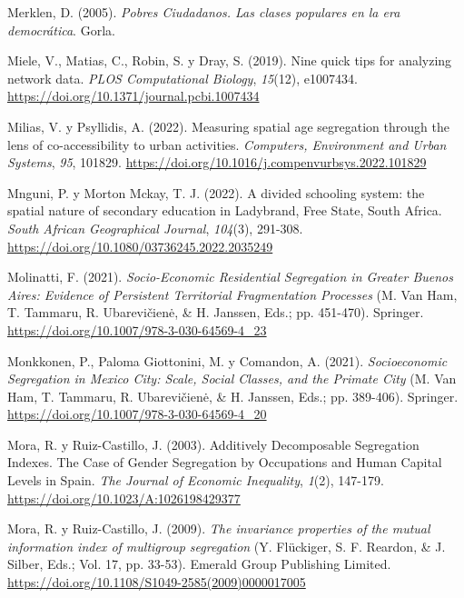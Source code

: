 \documentclass[
  spanish,
  a4paper,%
  chapterprefix=true,%
  DIV=calc,%
  twoside]{scrbook}%
\newlength{\cslhangindent}
\newenvironment{CSLReferences}[2] %
 {\begin{list}{}{%
  \setlength{\itemindent}{0pt}
  \setlength{\leftmargin}{0pt}
  \setlength{\parsep}{0pt}
  \ifodd #1
   \setlength{\leftmargin}{\cslhangindent}
   \setlength{\itemindent}{-1\cslhangindent}
  \fi
  \setlength{\itemsep}{#2\baselineskip}}}
 {\end{list}}
\begin{document}
\begin{CSLReferences}{1}{0}
Merklen, D. (2005). \emph{Pobres Ciudadanos. Las clases populares en la era democrática}. Gorla.

Miele, V., Matias, C., Robin, S. y Dray, S. (2019). Nine quick tips for analyzing network data. \emph{PLOS Computational Biology}, \emph{15}(12), e1007434. \url{https://doi.org/10.1371/journal.pcbi.1007434}

Milias, V. y Psyllidis, A. (2022). Measuring spatial age segregation through the lens of co-accessibility to urban activities. \emph{Computers, Environment and Urban Systems}, \emph{95}, 101829. \url{https://doi.org/10.1016/j.compenvurbsys.2022.101829}

Mnguni, P. y Morton Mckay, T. J. (2022). A divided schooling system: the spatial nature of secondary education in Ladybrand, Free State, South Africa. \emph{South African Geographical Journal}, \emph{104}(3), 291-308. \url{https://doi.org/10.1080/03736245.2022.2035249}

Molinatti, F. (2021). \emph{Socio-Economic Residential Segregation in Greater Buenos Aires: Evidence of Persistent Territorial Fragmentation Processes} (M. Van Ham, T. Tammaru, R. Ubarevičienė, \& H. Janssen, Eds.; pp. 451-470). Springer. \url{https://doi.org/10.1007/978-3-030-64569-4_23}

Monkkonen, P., Paloma Giottonini, M. y Comandon, A. (2021). \emph{Socioeconomic Segregation in Mexico City: Scale, Social Classes, and the Primate City} (M. Van Ham, T. Tammaru, R. Ubarevičienė, \& H. Janssen, Eds.; pp. 389-406). Springer. \url{https://doi.org/10.1007/978-3-030-64569-4_20}

Mora, R. y Ruiz-Castillo, J. (2003). Additively Decomposable Segregation Indexes. The Case of Gender Segregation by Occupations and Human Capital Levels in Spain. \emph{The Journal of Economic Inequality}, \emph{1}(2), 147-179. \url{https://doi.org/10.1023/A:1026198429377}

Mora, R. y Ruiz-Castillo, J. (2009). \emph{The invariance properties of the mutual information index of multigroup segregation} (Y. Flückiger, S. F. Reardon, \& J. Silber, Eds.; Vol. 17, pp. 33-53). Emerald Group Publishing Limited. \url{https://doi.org/10.1108/S1049-2585(2009)0000017005}


\end{CSLReferences}
\end{document}
